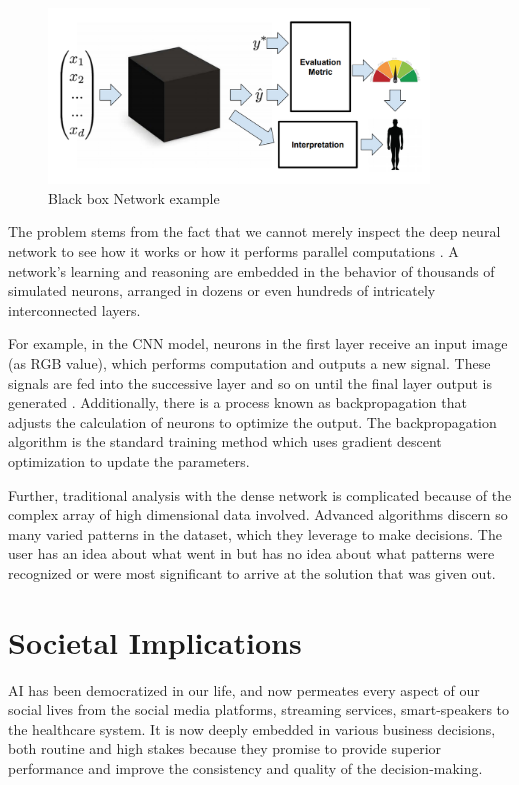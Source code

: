 \begin{figure}[htbp]
\centering
\includegraphics[width=0.90\textwidth]{images/Black-box.png}
\caption{Black box Network example}
\label{fig:blackbox}
\end{figure}

The problem stems from the fact that we cannot merely inspect the deep neural network to see how it works or how it performs parallel computations \cite{darksecretaimittr}. A network’s learning and reasoning are embedded in the behavior of thousands of simulated neurons, arranged in dozens or even hundreds of intricately interconnected layers. 

For example, in the CNN model, neurons in the first layer receive an input image (as RGB value), which performs computation and outputs a new signal. These signals are fed into the successive layer and so on until the final layer output is generated \cite{darksecretaimittr}. Additionally, there is a process known as backpropagation that adjusts the calculation of neurons to optimize the output. The backpropagation algorithm is the standard training method which uses gradient descent optimization to update the parameters.

Further, traditional analysis with the dense network is complicated because of the complex array of high dimensional data involved. Advanced algorithms discern so many varied patterns in the dataset, which they leverage to make decisions. The user has an idea about what went in but has no idea about what patterns were recognized or were most significant to arrive at the solution that was given out.

\section{Societal Implications}

AI has been democratized in our life, and now permeates every aspect of our social lives from the social media platforms, streaming services, smart-speakers to the healthcare system. It is now deeply embedded in various business decisions, both routine and high stakes because they promise to provide superior performance and improve the consistency and quality of the decision-making. 

